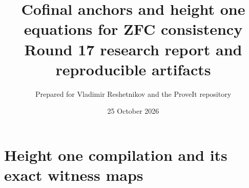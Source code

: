 \documentclass[11pt,a4paper]{article}
\title{Cofinal anchors and height one equations for ZFC consistency\\[8pt]\large Round 17 research report and reproducible artifacts}
\author{Prepared for Vladimir Reshetnikov and the ProveIt repository}
\date{25 October 2026}
\theoremstyle{remark}\newtheorem{remark}[theorem]{Remark}
\begin{document}
\maketitle

\clearpage\tableofcontents\clearpage







\section{Height one compilation and its exact witness maps}





\end{document}
